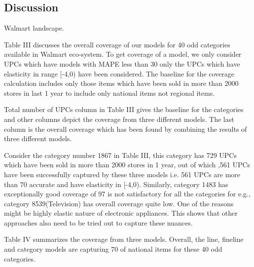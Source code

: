 \subsection{Discussion}  
Walmart landscape. 

Table III discusses the overall coverage of our models for 40 odd categories available in Walmart eco-system. 
To get coverage of a model, we only consider UPCs which have models with MAPE less than 30%
only the UPCs which have elasticity in range [-4,0) have been considered. The baseline for the coverage calculation 
includes only those items which have been sold in more than 2000 stores in last 1 year to include only national items not 
regional items. 

Total number of UPCs column in Table III gives the baseline for the categories and other columns depict the coverage 
from three different models. The last column is the overall coverage which has been found by combining the results of 
three different models.

Consider the category number 1867 in Table III, this category has 729 UPCs which have been sold in more than 2000 stores 
in 1 year, out of which ,561 UPCs have been successfully captured by these three models i.e. 561 UPCs are more than 70%
accurate and have elasticity in [-4,0). Similarly, category 1483 has exceptionally good coverage of 97%
is not satisfactory for all the categories for e.g., category 8539(Television) has overall coverage quite low. One of the 
reasons might be highly elastic nature of electronic appliances. This shows that other approaches also need to be tried out
 to capture these nuances. 

Table IV summarizes the coverage from three models. Overall, the line, fineline and category models are capturing 70%
of national items for these 40 odd categories. 

